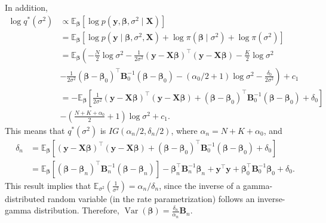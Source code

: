 In addition,
\begin{align*}
	\log q^*(\sigma^2)&\propto\mathbb{E}_{\boldsymbol{\beta}}[\log p(\boldsymbol{y},\boldsymbol{\beta},\sigma^2\mid\boldsymbol{X})]\\
	&=\mathbb{E}_{\boldsymbol{\beta}}[\log p(\boldsymbol{y}\mid\boldsymbol{\beta},\sigma^2,\boldsymbol{X}) +\log \pi(\boldsymbol{\beta}\mid\sigma^2)+\log \pi(\sigma^2)]\\
	&=\mathbb{E}_{\boldsymbol{\beta}}\left(-\frac{N}{2}\log\sigma^2-\frac{1}{2\sigma^2}(\boldsymbol{y}-\boldsymbol{X}\boldsymbol{\beta})^{\top}(\boldsymbol{y}-\boldsymbol{X}\boldsymbol{\beta})-\frac{K}{2}\log\sigma^2\right.\\
	&\left.-\frac{1}{2\sigma^2}(\boldsymbol{\beta}-\boldsymbol{\beta}_0)^{\top}\boldsymbol{B}_0^{-1}(\boldsymbol{\beta}-\boldsymbol{\beta}_0)-(\alpha_0/2+1)\log \sigma^2 -\frac{\delta_0}{2\sigma^2}\right)+c_1\\
	&=-\mathbb{E}_{\boldsymbol{\beta}}\left[\frac{1}{2\sigma^2}(\boldsymbol{y}-\boldsymbol{X}\boldsymbol{\beta})^{\top}(\boldsymbol{y}-\boldsymbol{X}\boldsymbol{\beta})+(\boldsymbol{\beta}-\boldsymbol{\beta}_0)^{\top}\boldsymbol{B}_0^{-1}(\boldsymbol{\beta}-\boldsymbol{\beta}_0)+\delta_0\right]\\
	&-\left(\frac{N+K+\alpha_0}{2}+1\right)\log\sigma^2+c_1.
\end{align*}
This means that $q^*(\sigma^2)$ is $IG(\alpha_n/2,\delta_n/2)$, where $\alpha_n=N+K+\alpha_0$, and
\begin{align*}
	\delta_n&=\mathbb{E}_{\boldsymbol{\beta}}\left[(\boldsymbol{y}-\boldsymbol{X}\boldsymbol{\beta})^{\top}(\boldsymbol{y}-\boldsymbol{X}\boldsymbol{\beta})+(\boldsymbol{\beta}-\boldsymbol{\beta}_0)^{\top}\boldsymbol{B}_0^{-1}(\boldsymbol{\beta}-\boldsymbol{\beta}_0)+\delta_0\right]\\
	&=\mathbb{E}_{\boldsymbol{\beta}}\left[(\boldsymbol{\beta}-\boldsymbol{\beta}_n)^{\top}\boldsymbol{B}_n^{-1}(\boldsymbol{\beta}-\boldsymbol{\beta}_n)\right]-\boldsymbol{\beta}_n^{\top}\boldsymbol{B}_n^{-1}\boldsymbol{\beta}_n+\boldsymbol{y}^{\top}\boldsymbol{y}+\boldsymbol{\beta}_0^{\top}\boldsymbol{B}_0^{-1}\boldsymbol{\beta}_0+\delta_0.
\end{align*} 
This result implies that $\mathbb{E}_{\sigma^2}\left(\frac{1}{\sigma^2}\right) = \alpha_n / \delta_n$, since the inverse of a gamma-distributed random variable (in the rate parametrization) follows an inverse-gamma distribution. Therefore, $\operatorname{Var}(\boldsymbol{\beta}) = \frac{\delta_n}{\alpha_n} \boldsymbol{B}_n$.
